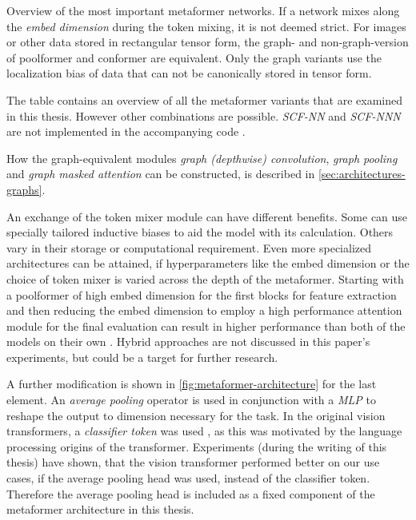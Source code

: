 \begin{table}[htbp]
    \vspace{0.5cm}
    \caption{Overview of the most important metaformer networks. If a network mixes along the \emph{embed dimension} during the token mixing, it is not deemed strict.
    For images or other data stored in rectangular tensor form, the graph- and non-graph-version of poolformer and conformer are equivalent.
    Only the graph variants use the localization bias of data that can not be canonically stored in tensor form. 
    }
    \label{table:metaformer-names}
\end{table}

The table contains an overview of all the metaformer variants that are examined in this thesis.
However other combinations are possible. \emph{SCF-NN} and \emph{SCF-NNN} are not implemented in the accompanying code \cite{selfPhysics, selfComputerScience}.

How the graph-equivalent modules \emph{graph (depthwise) convolution}, \emph{graph pooling} and \emph{graph masked attention} can be constructed, is described in \autoref{sec:architectures-graphs}.

An exchange of the token mixer module can have different benefits. 
Some can use specially tailored inductive biases to aid the model with its calculation.
Others vary in their storage or computational requirement.
Even more specialized architectures can be attained, if hyperparameters like the embed dimension or the choice of token mixer is varied across the depth of the metaformer. 
Starting with a poolformer of high embed dimension for the first blocks for feature extraction and then reducing the embed dimension to employ a high performance attention module for the final evaluation can result in higher performance than both of the models on their own \cite{metaformerPaper}. 
Hybrid approaches are not discussed in this paper's experiments, but could be a target for further research.

A further modification is shown in \autoref{fig:metaformer-architecture} for the last element.
An \emph{average pooling} operator is used in conjunction with a \emph{MLP} to reshape the output to dimension necessary for the task. 
In the original vision transformers, a \emph{classifier token} was used \cite{dinoPaper}, as this was motivated by the language processing origins of the transformer.
Experiments (during the writing of this thesis) have shown, that the vision transformer performed better on our use cases, if the average pooling head was used, instead of the classifier token. 
Therefore the average pooling head is included as a fixed component of the metaformer architecture in this thesis.
